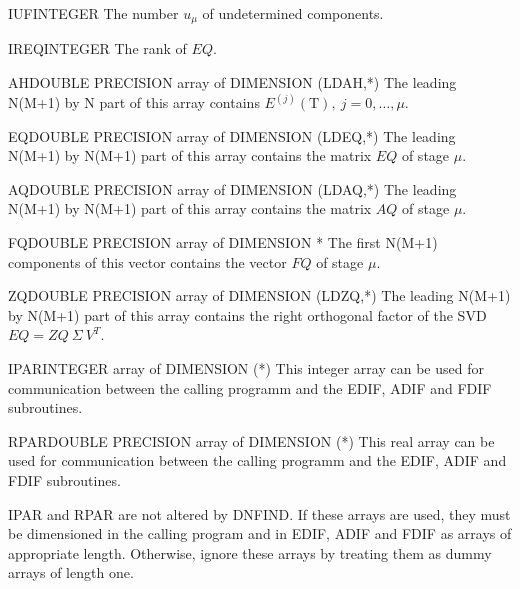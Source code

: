 \begin{entry}{IUF}{INTEGER}
  The number $u_{\mu}$ of undetermined components. 
\end{entry}

\begin{entry}{IREQ}{INTEGER}
  The rank of $EQ$.
\end{entry}

\begin{entry}{AH}{DOUBLE PRECISION array of DIMENSION (LDAH,*)}
  The leading N(M+1) by N part of this array contains 
  $E^{(j)}(\mbox{T}),\ j=0,\dots,\mu$. 
\end{entry}

\begin{entry}{EQ}{DOUBLE PRECISION array of DIMENSION (LDEQ,*)}
  The leading N(M+1) by N(M+1) part of this array contains the
  matrix $EQ$ of stage $\mu$.
\end{entry}

\begin{entry}{AQ}{DOUBLE PRECISION array of DIMENSION (LDAQ,*)}
  The leading N(M+1) by N(M+1) part of this array contains the
  matrix $AQ$ of stage $\mu$.
\end{entry}

\begin{entry}{FQ}{DOUBLE PRECISION array of DIMENSION *}
  The first N(M+1) components of this vector contains the vector
  $FQ$ of stage $\mu$. 
\end{entry}

\begin{entry}{ZQ}{DOUBLE PRECISION array of DIMENSION (LDZQ,*)}
  The leading N(M+1) by N(M+1) part of this array contains the
  right orthogonal factor of the SVD $EQ = ZQ\ \Sigma\ V^T$. 
\end{entry}

\begin{entry}{IPAR}{INTEGER array of DIMENSION (*)}
  This integer array can be used for communication between the calling
  programm and the EDIF, ADIF and FDIF subroutines.
\end{entry}

\begin{entry}{RPAR}{DOUBLE PRECISION array of DIMENSION (*)}
  This real array can be used for communication between the calling 
  programm and the EDIF, ADIF and FDIF subroutines.

  IPAR and RPAR are not altered by DNFIND. If these arrays are used,
  they must be dimensioned in the calling program and in EDIF, ADIF
  and FDIF as arrays of appropriate length. Otherwise, ignore these
  arrays by treating them as dummy arrays of length one. 
\end{entry}

